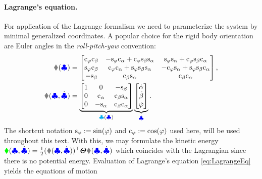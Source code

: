 \paragraph{Lagrange's equation.}
For application of the Lagrange formalism we need to parameterize the system by minimal generalized coordinates.
A popular choice for the rigid body orientation are Euler angles in the \textit{roll-pitch-yaw} convention:
\begin{subequations}\label{eq:EulerAngleParam}
\begin{align}
 \R(\genCoord) &=
 \begin{bmatrix}
  \cyaw \cpit & -\syaw \crol+\cyaw \spit \srol & \syaw \srol+\cyaw \spit \crol \\
  \syaw \cpit & \cyaw \crol+\syaw \spit \srol & -\cyaw \srol+\syaw \spit \crol \\
  -\spit & \cpit \srol & \cpit \crol  
 \end{bmatrix},
 \label{eq:EulerAngleParamR}
\\
 \w(\genCoord, \genCoordd) &=
 \underbrace{\begin{bmatrix}
  1 & 0 & -\spit \\
  0 & \crol & \cpit \srol \\
  0 & -\srol & \cpit \crol
 \end{bmatrix}}_{\kinBasisMat(\genCoord)}
 \underbrace{\begin{bmatrix} \rold \\ \pitd \\ \yawd \end{bmatrix}}_{\genCoordd}.
 \label{eq:EulerAngleParamW}
\end{align}
\end{subequations}
The shortcut notation $\mathrm{s}_{\varphi} := \sin(\varphi)$ and $\mathrm{c}_{\varphi} := \cos(\varphi)$ used here, will be used throughout this text.
With this, we may formulate the kinetic energy $\kineticEnergy(\genCoord, \genCoordd) = \tfrac{1}{2} (\w(\genCoord, \genCoordd))^\top \J \w(\genCoord, \genCoordd)$ which coincides with the Lagrangian since there is no potential energy.
Evaluation of Lagrange's equation \eqref{eq:LagrangeEq} yields the equations of motion 

